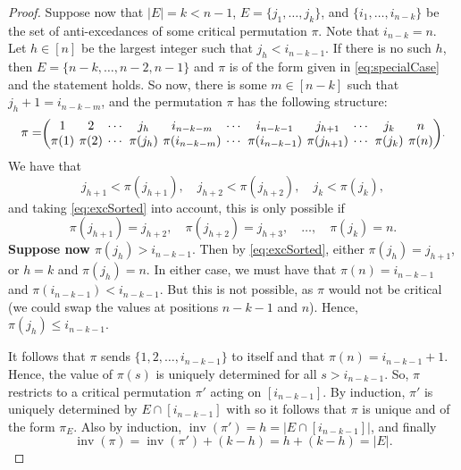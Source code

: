 \documentclass[reqno]{amsart}
\theoremstyle{definition}
\DeclareMathOperator{\inv}{inv}
\begin{document}
\begin{proof}
Suppose now that $|E|=k<n-1$, $E = \{j_1,\dotsc,j_k\}$, and $\{i_1,\dotsc,i_{n-k}\}$ be 
the set of anti-excedances of some critical permutation $\pi$.
Note that $i_{n-k}=n$.
Let $h \in [n]$ be the largest integer such that $j_h < i_{n-k-1}$.
If there is no such $h$, then $E = \{n-k,\dotsc,n-2,n-1\}$
and $\pi$ is of the form given in \eqref{eq:specialCase}
and the statement holds.
%
So now, there is some $m \in [n-k]$ such that $j_h+1=i_{n-k-m}$,
and the permutation $\pi$ has the following structure:
\[
 \pi =
 \begingroup
 \setcounter{MaxMatrixCols}{20}
 \setlength\arraycolsep{2pt}
 \scriptstyle{
 \begin{pmatrix}
 1      & 2      & \dotsb & j_h & i_{n-k-m}  & \dotsb   & i_{n-k-1}      & j_{h+1} & \dotsb    & j_{k} &  n \\
 \pi(1) & \pi(2) & \dotsb & \pi(j_h) & \pi(i_{n-k-m}) & \dotsb & \pi(i_{n-k-1}) & \pi(j_{h+1}) & \dotsb & \pi(j_{k})  & \pi(n)
\end{pmatrix}}.
\endgroup
\]
We have that
\[
j_{h+1} < \pi(j_{h+1}), \quad j_{h+2}<\pi(j_{h+2}), \quad j_{k}<\pi(j_{k}),
\]
and taking \eqref{eq:excSorted} into account, this is only possible if 
\[
 \pi(j_{h+1}) = j_{h+2},\quad \pi(j_{h+2}) = j_{h+3},\quad \dotsc, \quad \pi(j_{k}) = n.
\]
%
\textbf{Suppose now $\pi(j_h)>i_{n-k-1}$}. Then by \eqref{eq:excSorted},
either $\pi(j_h)=j_{h+1}$, or $h=k$ and $\pi(j_h)=n$.
In either case, we must have that
$\pi(n)=i_{n-k-1}$ and $\pi(i_{n-k-1}) < i_{n-k-1}$.
But this is not possible, as $\pi$ would not be critical (we could swap
the values at positions $n-k-1$ and $n$).
Hence, $\pi(j_h) \leq i_{n-k-1}$.
\medskip 

It follows that $\pi$ sends $\{1,2,\dotsc,i_{n-k-1}\}$ to itself
and that $\pi(n) = i_{n-k-1} + 1$. Hence,
the value of $\pi(s)$ is uniquely determined for all
$s > i_{n-k-1}$.
So, $\pi$ restricts to a critical permutation $\pi'$
acting on $[i_{n-k-1}]$.
By induction, $\pi'$ is uniquely determined by $E \cap [i_{n-k-1}]$ with 
so it follows that $\pi$ is unique and of the form $\pi_E$.
Also by induction, $\inv(\pi') = h = |E \cap [i_{n-k-1}]|$,
and finally 
\[
  \inv(\pi) = \inv(\pi') + (k-h) = h + (k-h) = |E|.
\]
\end{proof}
\end{document}
